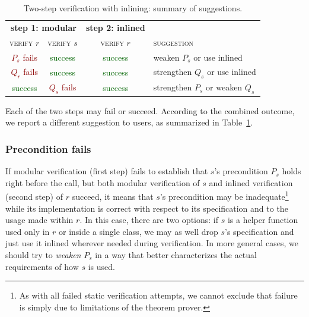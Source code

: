 \begin{table}[!tbh]
\centering
\begin{tabular}{cc c l}
\multicolumn{2}{c}{\textbf{step 1: modular}}  & \multicolumn{1}{c}{\textbf{step 2: inlined}}  & \\
\textsc{verify} $r$  &  \textsc{verify} $s$  &  \textsc{verify} $r$ & \textsc{suggestion} \\
\hline
\textcolor{darkred}{$P_s$ fails}  &  \textcolor{darkgreen}{success}  &  \textcolor{darkgreen}{success}  & weaken $P_s$ or use inlined \e{s} \\
\textcolor{darkred}{$Q_r$ fails}  &  \textcolor{darkgreen}{success}  &  \textcolor{darkgreen}{success}  & strengthen $Q_s$ or use inlined \e{s} \\
\textcolor{darkgreen}{success}  &  \textcolor{darkred}{$Q_s$ fails}  &  \textcolor{darkgreen}{success}  & strengthen $P_s$ or weaken $Q_s$
\end{tabular}
  \caption{Two-step verification with inlining: summary of suggestions.}
  \label{tab:two-step-inline-summary}
\end{table}


Each of the two steps may fail or succeed.
According to the combined outcome, we report a different suggestion to users, as summarized in Table~\ref{tab:two-step-inline-summary}.

\subsubsection{Precondition fails}

If modular verification (first step) fails to establish that $s$'s precondition $P_s$ holds right before the call, but both modular verification of $s$ and inlined verification (second step) of $r$ succeed, it means that $s$'s precondition may be inadequate\footnote{As with all failed static verification attempts, we cannot exclude that failure is simply due to limitations of the theorem prover.} while its implementation is correct with respect to its specification and to the usage made within $r$.
In this case, there are two options: if $s$ is a helper function used only in $r$ or inside a single class, we may as well drop $s$'s specification and just use it inlined wherever needed during verification.
In more general cases, we should try to \emph{weaken} $P_s$ in a way that better characterizes the actual requirements of how $s$ is used.


